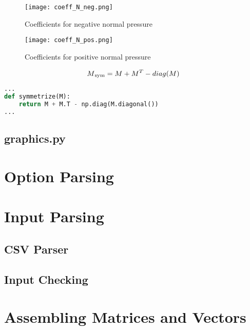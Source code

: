 \begin{figure}[h]%
    \centering
    \texttt{[image: coeff\_N\_neg.png]}%
    \caption{Coefficients for negative normal pressure}%
    \label{fig:coeff_N_neg}%
\end{figure}

\begin{figure}[h]%
    \centering
    \texttt{[image: coeff\_N\_pos.png]}%
    \caption{Coefficients for positive normal pressure}%
    \label{fig:coeff_N_pos}%
\end{figure}

\begin{equation} \label{symmetrize}
    M\textsubscript{sym} = M + M^T - diag(M)
\end{equation}


\begin{inconsolata}
\begin{lstlisting}[language=python]
...
def symmetrize(M):
    return M + M.T - np.diag(M.diagonal())
...
\end{lstlisting}
\end{inconsolata}


\subsection{graphics.py}
\label{subsec:graphics.py}


\pagebreak

\section{Option Parsing}
\label{sec:optparse}


\section{Input Parsing}
\label{sec:inputpars}

\subsection{CSV Parser}
\label{sec:csvparse}

\subsection{Input Checking}
\label{sec:inputcheck}


\section{Assembling Matrices and Vectors}
\label{sec:asmmatrvec}

